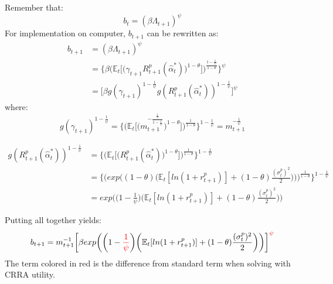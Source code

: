 \documentclass[12pt,a4paper]{article}
\begin{document}
Remember that: 
\begin{equation*}
    b_t=(\beta\Lambda_{t+1})^\psi
\end{equation*}
For implementation on computer, $b_{t+1}$ can be rewritten as:
\begin{align*}
    b_{t+1} &= (\beta\Lambda_{t+1})^\psi\\
        &= \Bigg\{\beta \bigg(\mathbb{E}_t\bigg[\big(\gamma_{t+1}R^{p}_{t+1}(\hat{\alpha}_t^*)\big)^{1-\theta}\bigg]\bigg)^\frac{1-\frac{1}{\psi}}{1-\theta}\Bigg\}^\psi\\
        &= \bigg[\beta g(\gamma_{t+1})^{1-\frac{1}{\psi}}g(R_{t+1}^p(\hat{\alpha}_t^*))^{1-\frac{1}{\psi}}\bigg]^\psi
\end{align*}
where: 
\begin{equation*}
  g(\gamma_{t+1})^{1-\frac{1}{\psi}}= \Bigg\{ \Bigg(\mathbb{E}_t\bigg[ \big(m_{t+1}^{-\frac{\frac{1}{\psi}}{1-\frac{1}{\psi}}}\big)^{1-\theta}\bigg]\Bigg)^{\frac{1}{1-\theta}}\Bigg\}^{1-\frac{1}{\psi}}=m_{t+1}^{-\frac{1}{\psi}}
\end{equation*}

\begin{align*}
  g(R_{t+1}^p(\hat{\alpha}_t^*))^{1-\frac{1}{\psi}}&= \Bigg\{ \Bigg(\mathbb{E}_t\bigg[ \big(  R_{t+1}^p(\hat{\alpha}_t^*)          \big)^{1-\theta}\bigg]\Bigg)^{\frac{1}{1-\theta}}\Bigg\}^{1-\frac{1}{\psi}}\\
  &= \Bigg\{ \Bigg(  exp\bigg((1-\theta)\bigg(\mathbb{E}_t[ln(1+r^p_{t+1})]+(1-\theta)\frac{(\sigma_t^p)^2}{2}\bigg)\bigg)      \Bigg)^{\frac{1}{1-\theta}}\Bigg\}^{1-\frac{1}{\psi}}\\
  &= exp\bigg(\bigg(1-\frac{1}{\psi}\bigg)\bigg(\mathbb{E}_t[ln(1+r^p_{t+1})]+(1-\theta)\frac{(\sigma_t^p)^2}{2}\bigg)\bigg)  
\end{align*}

Putting all together yields: 
\begin{equation*}
    b_{t+1}=m_{t+1}^{-1}\bigg[\beta  exp\bigg(\bigg(1-\textcolor{red}{\frac{1}{\psi}}\bigg)\bigg(\mathbb{E}_t[ln(1+r^p_{t+1})]+(1-\theta)\frac{(\sigma_t^p)^2}{2}\bigg)\bigg)\bigg]^{\textcolor{red}{\psi}}
\end{equation*}
The term colored in red is the difference from standard term when solving with CRRA utility. 
\end{document}
